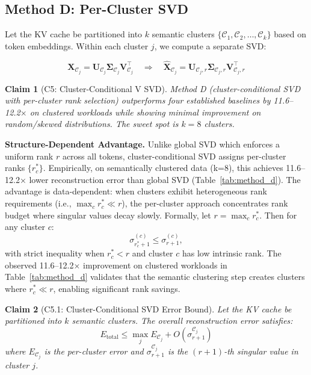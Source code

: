 \documentclass[11pt, a4paper, oneside]{article}
\newtheorem{claim}{Claim}
\theoremstyle{myplain}
\theoremstyle{mydefinition}
\theoremstyle{myremark}
\begin{document}
\subsection{Method D: Per-Cluster SVD}

Let the KV cache be partitioned into $k$ semantic clusters $\{\mathcal{C}_1, \mathcal{C}_2, \ldots, \mathcal{C}_k\}$ based on token embeddings. Within each cluster $j$, we compute a separate SVD:

\begin{equation}
    \mathbf{X}_{\mathcal{C}_j} = \mathbf{U}_{\mathcal{C}_j} \mathbf{\Sigma}_{\mathcal{C}_j} \mathbf{V}_{\mathcal{C}_j}^\top \quad \Rightarrow \quad \mathbf{\hat{X}}_{\mathcal{C}_j} = \mathbf{U}_{\mathcal{C}_j, r} \mathbf{\Sigma}_{\mathcal{C}_j, r} \mathbf{V}_{\mathcal{C}_j, r}^\top
    \label{eq:cluster_svd}
\end{equation}

\begin{claim}[C5: Cluster-Conditional V SVD]
    Method D (cluster-conditional SVD with per-cluster rank selection) outperforms four established baselines by 11.6--12.2$\times$ on clustered workloads while showing minimal improvement on random/skewed distributions. The sweet spot is $k=8$ clusters.
    \label{claim:method_d}
\end{claim}

\textbf{Structure-Dependent Advantage.} Unlike global SVD which enforces a uniform rank $r$ across all tokens, cluster-conditional SVD assigns per-cluster ranks $\{r_c^*\}$. Empirically, on semantically clustered data (k=8), this achieves 11.6--12.2× lower reconstruction error than global SVD (Table~\ref{tab:method_d}). The advantage is data-dependent: when clusters exhibit heterogeneous rank requirements (i.e., $\max_c r_c^* \ll r$), the per-cluster approach concentrates rank budget where singular values decay slowly. Formally, let $r = \max_c r_c^*$. Then for any cluster $c$:
\[
\sigma_{r_c^*+1}^{(c)} \leq \sigma_{r+1}^{(c)},
\]
with strict inequality when $r_c^* < r$ and cluster $c$ has low intrinsic rank. The observed 11.6--12.2× improvement on clustered workloads in Table~\ref{tab:method_d} validates that the semantic clustering step creates clusters where $r_c^* \ll r$, enabling significant rank savings.

\begin{claim}[C5.1: Cluster-Conditional SVD Error Bound]
    Let the KV cache be partitioned into $k$ semantic clusters. The overall reconstruction error satisfies:
    \begin{equation}
        E_{\text{total}} \leq \max_j E_{\mathcal{C}_j} + O\left(\sigma_{r+1}^{\mathcal{C}_j}\right)
        \label{eq:cluster_error}
    \end{equation}
    where $E_{\mathcal{C}_j}$ is the per-cluster error and $\sigma_{r+1}^{\mathcal{C}_j}$ is the $(r+1)$-th singular value in cluster $j$.
\end{claim}
\end{document}
